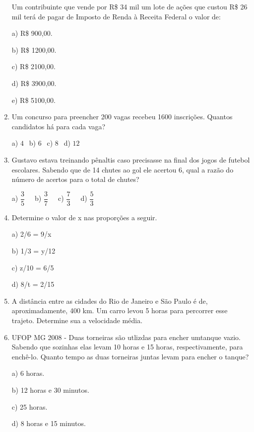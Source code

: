 \begin{multicols*}{2}
\begin{enumerate}
		      Um contribuinte que vende por R\$ 34 mil um lote de ações que custou R\$ 26 mil terá de pagar de Imposto de Renda à
		      Receita Federal o valor de:

		      a) R\$ 900,00.

		      b) R\$ 1200,00.

		      c) R\$ 2100,00.

		      d) R\$ 3900,00.

		      e) R\$ 5100,00.\\

		\item Um concurso para preencher 200 vagas recebeu 1600 inscrições. Quantos candidatos há para cada vaga?

		      a) $4 \ \ $ b) $6 \ \ $ c) $8 \ \ $ d) $12 \ \ $

		\item Gustavo estava treinando pênaltis caso precisasse na final dos jogos de futebol escolares. Sabendo que de 14 chutes ao gol ele acertou 6, qual a razão do número de acertos para o total de chutes?

		      a) $\dfrac{3}{5} \ \ \ \ \ $ b) $\dfrac{3}{7} \ \ \ \ \ $ c) $\dfrac{7}{3} \ \ \ \ \ $ d) $\dfrac{5}{3} $

		\item Determine o valor de x nas proporções a seguir.

		      a) 2/6 = 9/x

		      b) 1/3 = y/12

		      c) z/10 = 6/5

		      d) 8/t = 2/15\\

		\item A distância entre as cidades do Rio de Janeiro e São Paulo é de, aproximadamente, 400 km. Um carro levou 5 horas para percorrer esse trajeto. Determine sua a velocidade média.\\

		\item UFOP MG 2008 - Duas torneiras são utlizdas para encher umtanque vazio. Sabendo que sozinhas elas levam 10 horas e 15 horas, respectivamente, para enchê-lo. Quanto tempo as duas torneiras juntas levam para encher o tanque?

		      a)	6 horas.

		      b) 12 horas e 30 minutos.

		      c) 25 horas.

		      d) 8 horas e 15 minutos.\\


\end{enumerate}
\end{multicols*}
